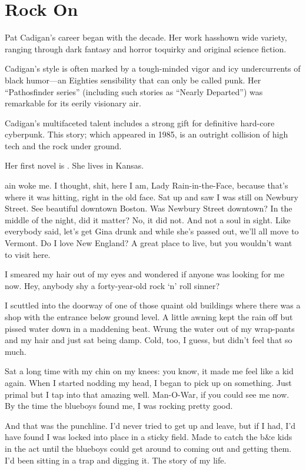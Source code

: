 \chapter{Rock On}

Pat Cadigan's career began with the decade. Her work hasshown wide variety, ranging through dark fantasy and horror toquirky and original science fiction.

Cadigan's style is often marked by a tough-minded vigor and icy undercurrents of black humor—an Eighties sensibility that can only be called punk. Her ``Pathosfinder series'' (including such stories as ``Nearly Departed'') was remarkable for its eerily visionary air.

Cadigan's multifaceted talent includes a strong gift for definitive hard-core cyberpunk. This story; which appeared in 1985, is an outright collision of high tech and the rock under ground.

Her first novel is . She lives in Kansas.

\hrulefill

ain woke me. I thought, shit, here I am, Lady Rain-in-the-Face, because that's where it was hitting, right in the old face. Sat up and saw I was still on Newbury Street. See beautiful downtown Boston. Was Newbury Street downtown? In the middle of the night, did it matter? No, it did not. And not a soul in sight. Like everybody said, let's get Gina drunk and while she's passed out, we'll all move to Vermont. Do I love New England? A great place to live, but you wouldn't want to visit here.

I smeared my hair out of my eyes and wondered if anyone was looking for me now. Hey, anybody shy a forty-year-old rock `n' roll sinner?

I scuttled into the doorway of one of those quaint old buildings where there was a shop with the entrance below ground level. A little awning kept the rain off but pissed water down in a maddening beat. Wrung the water out of my wrap-pants and my hair and just sat being damp. Cold, too, I guess, but didn't feel that so much.

Sat a long time with my chin on my knees: you know, it made me feel like a kid again. When I started nodding my head, I began to pick up on something. Just primal but I tap into that amazing well. Man-O-War, if you could see me now. By the time the blueboys found me, I was rocking pretty good.

And that was the punchline. I'd never tried to get up and leave, but if I had, I'd have found I was locked into place in a sticky field. Made to catch the b\&e kids in the act until the blueboys could get around to coming out and getting them. I'd been sitting in a trap and digging it. The story of my life.

